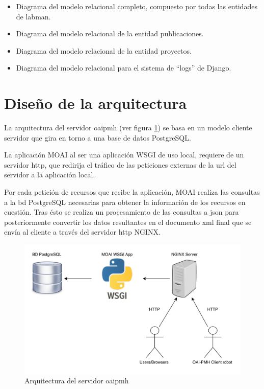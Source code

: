 \begin{itemize}
	\item Diagrama del modelo relacional completo, compuesto por todas las entidades de \acrshort{labman}.
	\item Diagrama del modelo relacional de la entidad publicaciones.
	\item Diagrama del modelo relacional de la entidad proyectos.
	\item Diagrama del modelo relacional para el sistema de ``logs'' de Django.
\end{itemize}

\section{Diseño de la arquitectura}

La arquitectura del servidor \acrshort{oaipmh} (ver figura \ref{fig:oai_architecture}) se basa en un modelo cliente servidor que gira en torno a una base de datos PostgreSQL.

La aplicación MOAI al ser una aplicación WSGI de uso local, requiere de un servidor \acrshort{http}, que redirija el tráfico de las peticiones externas de la \acrshort{url} del servidor a la aplicación local.

Por cada petición de recursos que recibe la aplicación, MOAI realiza las consultas a la \acrshort{bd} PostgreSQL necesarias para obtener la información de los recursos en cuestión. Tras ésto se realiza un procesamiento de las consultas a \acrfull{json}\cite{JSON} para posteriormente convertir los datos resultantes en el documento \acrshort{xml} final que se envía al cliente a través del servidor \acrshort{http} NGINX\cite{NGINX}.

\begin{figure}[!htbp]
	\centering
	\includegraphics[scale=0.5]{fig/architecture/oai_achitecture}
	\caption{Arquitectura del servidor \acrshort{oaipmh}}
	\label{fig:oai_architecture}
\end{figure}

